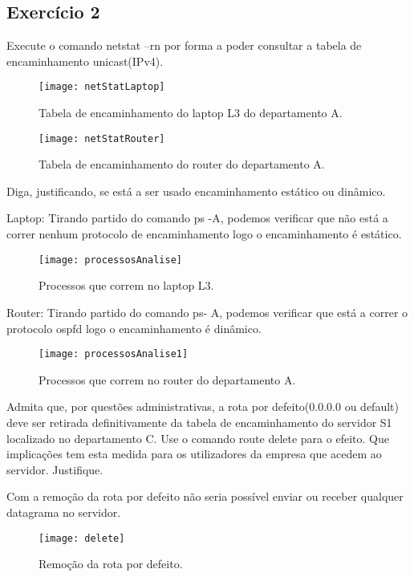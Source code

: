 \documentclass{exam}
\begin{document}
\subsection{Exercício 2}

\begin{questions}

\question Execute o	comando	netstat –rn por	forma a	poder consultar a tabela de	encaminhamento unicast(IPv4).
\begin{solution}
\begin{figure}[H]
\centering\texttt{[image: netStatLaptop]} 
\caption{\label{fig:controller}Tabela de encaminhamento do laptop L3 do departamento A.}
\end{figure} 
\begin{figure}[H]
\centering\texttt{[image: netStatRouter]} 
\caption{\label{fig:controller}Tabela de encaminhamento do router do departamento A.}
\end{figure} 
\end{solution}

\question Diga, justificando, se está a ser usado encaminhamento estático ou dinâmico.
\begin{solution}
Laptop: Tirando partido do comando ps -A, podemos verificar que não está a correr nenhum protocolo de encaminhamento 
logo o encaminhamento é estático.
\begin{figure}[H]
\centering\texttt{[image: processosAnalise]} 
\caption{\label{fig:controller}Processos que correm no laptop L3.}
\end{figure} 
Router: Tirando partido do comando ps- A, podemos verificar que está a correr o protocolo ospfd logo o encaminhamento é
dinâmico.
\begin{figure}[H]
\centering\texttt{[image: processosAnalise1]} 
\caption{\label{fig:controller}Processos que correm no router do departamento A.}
\end{figure} 
\end{solution}

\question Admita que, por questões administrativas, a	rota por defeito(0.0.0.0 ou	
default) deve ser retirada definitivamente da tabela de	encaminhamento	
do servidor S1 localizado no departamento C. Use o comando route
delete para	 o efeito. Que	implicações tem esta medida	para os
utilizadores da	empresa	que acedem ao servidor.	Justifique.
\begin{solution}
Com a remoção da rota por defeito não seria possível enviar ou receber qualquer datagrama no servidor.
\begin{figure}[H]
\centering\texttt{[image: delete]} 
\caption{\label{fig:controller}Remoção da rota por defeito.}
\end{figure} 
\end{solution}


\end{questions}
\end{document}
